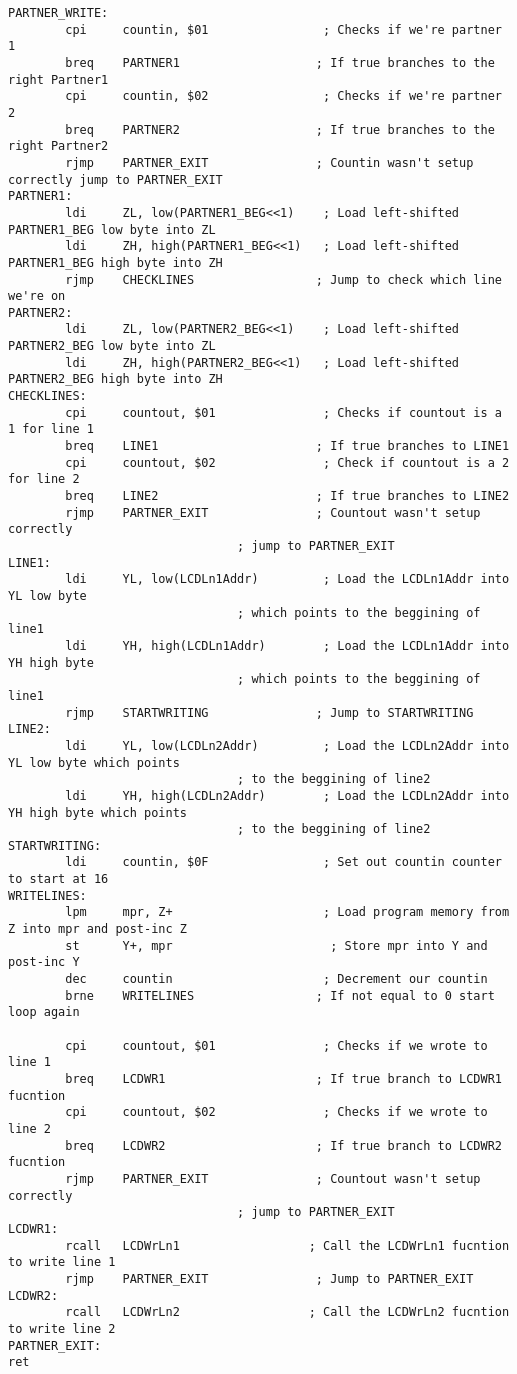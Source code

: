 \documentclass[12pt, letterpaper]{article}
\begin{document}
\begin{verbatim}
PARTNER_WRITE:
		cpi		countin, $01                ; Checks if we're partner 1
		breq	PARTNER1                   ; If true branches to the right Partner1
		cpi		countin, $02                ; Checks if we're partner 2
		breq	PARTNER2                   ; If true branches to the right Partner2
		rjmp	PARTNER_EXIT               ; Countin wasn't setup correctly jump to PARTNER_EXIT
PARTNER1:
		ldi		ZL, low(PARTNER1_BEG<<1)    ; Load left-shifted PARTNER1_BEG low byte into ZL
		ldi		ZH, high(PARTNER1_BEG<<1)  	; Load left-shifted PARTNER1_BEG high byte into ZH
		rjmp	CHECKLINES                 ; Jump to check which line we're on
PARTNER2:
		ldi		ZL, low(PARTNER2_BEG<<1)    ; Load left-shifted PARTNER2_BEG low byte into ZL
		ldi		ZH, high(PARTNER2_BEG<<1)   ; Load left-shifted PARTNER2_BEG high byte into ZH
CHECKLINES:
		cpi		countout, $01               ; Checks if countout is a 1 for line 1
		breq	LINE1                      ; If true branches to LINE1
		cpi		countout, $02               ; Check if countout is a 2 for line 2
		breq	LINE2                      ; If true branches to LINE2
		rjmp	PARTNER_EXIT               ; Countout wasn't setup correctly 
                                ; jump to PARTNER_EXIT
LINE1:
		ldi		YL, low(LCDLn1Addr)         ; Load the LCDLn1Addr into YL low byte
                                ; which points to the beggining of line1
		ldi		YH, high(LCDLn1Addr)        ; Load the LCDLn1Addr into YH high byte
                                ; which points to the beggining of line1
		rjmp	STARTWRITING               ; Jump to STARTWRITING
LINE2:
		ldi		YL, low(LCDLn2Addr)         ; Load the LCDLn2Addr into YL low byte which points
                                ; to the beggining of line2
		ldi		YH, high(LCDLn2Addr)        ; Load the LCDLn2Addr into YH high byte which points
                                ; to the beggining of line2
STARTWRITING:
		ldi		countin, $0F                ; Set out countin counter to start at 16
WRITELINES:
		lpm		mpr, Z+                     ; Load program memory from Z into mpr and post-inc Z
		st		Y+, mpr                      ; Store mpr into Y and post-inc Y
		dec		countin                     ; Decrement our countin
		brne	WRITELINES                 ; If not equal to 0 start loop again

		cpi		countout, $01               ; Checks if we wrote to line 1
		breq	LCDWR1                     ; If true branch to LCDWR1 fucntion
		cpi		countout, $02               ; Checks if we wrote to line 2
		breq	LCDWR2                     ; If true branch to LCDWR2 fucntion
		rjmp	PARTNER_EXIT               ; Countout wasn't setup correctly 
                                ; jump to PARTNER_EXIT
LCDWR1:
		rcall	LCDWrLn1                  ; Call the LCDWrLn1 fucntion to write line 1
		rjmp	PARTNER_EXIT               ; Jump to PARTNER_EXIT
LCDWR2:
		rcall	LCDWrLn2                  ; Call the LCDWrLn2 fucntion to write line 2
PARTNER_EXIT:
ret


\end{verbatim}
\end{document}
